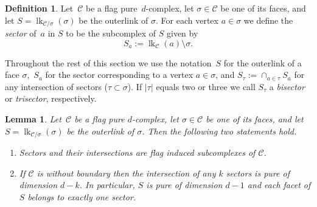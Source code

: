 \documentclass[a4paper,12pt]{amsart}
\theoremstyle{plain}
\newtheorem{lemma}[theorem]{Lemma}
\theoremstyle{definition}
\newtheorem{definition}[theorem]{Definition}
\newcommand{\darkred}{\color{darkred}} %
\newcommand{\C}{\mathcal C}
\newcommand{\face}{\sigma}
\newcommand{\smallface}{\tau}
\DeclareMathOperator{\link}{lk}
\newcommand{\defn}[1]{\emph{\darkred #1}} %
\begin{document}
\begin{definition}
  \label{def:sectors}
  Let~$\C$ be a flag pure~$d$-complex, let $\face \in \C$ be one of its faces, and let $S=\link_{\C/\face} (\face)$ be the outerlink of $\face$.
  For each vertex $a\in \face$ we define the \emph{sector} of~$a$ in $S$ to be the subcomplex of $S$ given by
  \[
    S_a :=\link_\C(a) \setminus \face.
  \]
\end{definition}

Throughout the rest of this section we use the notation~$S$ for the outerlink of a face $\face$,~$S_a$ for the sector corresponding to a vertex $a\in \face$, and $S_\smallface := \cap_{a\in \smallface} S_a$ for any intersection of sectors ($\smallface\subset \face$). If $|\smallface|$ equals two or three we call $S_\smallface$ a \defn{bisector} or \defn{trisector}, respectively.


\begin{lemma}
  \label{lem:induced}
Let~$\C$ be a flag pure $d$-complex, let $\face \in \C$ be one of its faces, and let $S=\link_{\C/\face} (\face)$ be the outerlink of $\face$. Then the following two statements hold.
\begin{enumerate}
\item Sectors and their intersections are flag induced subcomplexes of $\C$.

\item If $\C$ is without boundary then the intersection of any $k$ sectors is pure of dimension $d-k$. In particular, $S$ is pure of dimension $d-1$ and each facet of $S$ belongs to exactly one sector.
\end{enumerate}
\end{lemma}
\end{document}
